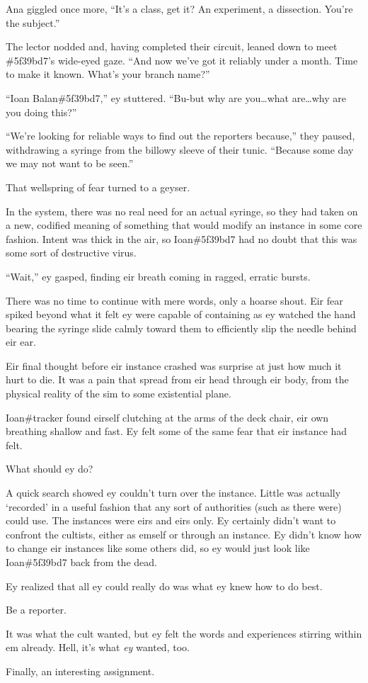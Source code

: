 Ana giggled once more, ``It's a class, get it? An experiment, a dissection. You're the subject.''

The lector nodded and, having completed their circuit, leaned down to meet \#5f39bd7's wide-eyed gaze. ``And now we've got it reliably under a month. Time to make it known. What's your branch name?''

``Ioan Balan\#5f39bd7,'' ey stuttered. ``Bu-but why are you\ldots{}what are\ldots{}why are you doing this?''

``We're looking for reliable ways to find out the reporters because,'' they paused, withdrawing a syringe from the billowy sleeve of their tunic. ``Because some day we may not want to be seen.''

That wellspring of fear turned to a geyser.

In the system, there was no real need for an actual syringe, so they had taken on a new, codified meaning of something that would modify an instance in some core fashion. Intent was thick in the air, so Ioan\#5f39bd7 had no doubt that this was some sort of destructive virus.

``Wait,'' ey gasped, finding eir breath coming in ragged, erratic bursts.

There was no time to continue with mere words, only a hoarse shout. Eir fear spiked beyond what it felt ey were capable of containing as ey watched the hand bearing the syringe slide calmly toward them to efficiently slip the needle behind eir ear.

Eir final thought before eir instance crashed was surprise at just how much it hurt to die. It was a pain that spread from eir head through eir body, from the physical reality of the sim to some existential plane.

\secdiv{}

\noindent Ioan\#tracker found eirself clutching at the arms of the deck chair, eir own breathing shallow and fast. Ey felt some of the same fear that eir instance had felt.

What should ey do?

A quick search showed ey couldn't turn over the instance. Little was actually `recorded' in a useful fashion that any sort of authorities (such as there were) could use. The instances were eirs and eirs only. Ey certainly didn't want to confront the cultists, either as emself or through an instance. Ey didn't know how to change eir instances like some others did, so ey would just look like Ioan\#5f39bd7 back from the dead.

Ey realized that all ey could really do was what ey knew how to do best.

Be a reporter.

It was what the cult wanted, but ey felt the words and experiences stirring within em already. Hell, it's what \emph{ey} wanted, too.

Finally, an interesting assignment.
